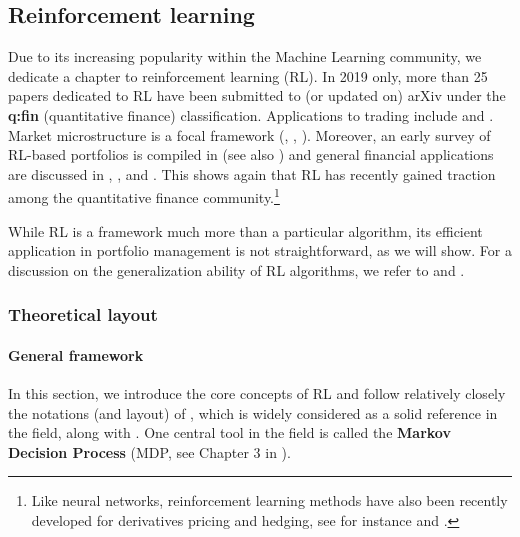 \subsection{Reinforcement learning}

Due to its increasing popularity within the Machine Learning community, we dedicate a chapter to reinforcement learning (RL). In 2019 only, more than 25 papers dedicated to RL have been submitted to (or updated on) arXiv under the \textbf{q:fin} (quantitative finance) classification. Applications to trading include \cite{xiong2018practical} and \cite{theate2020application}. Market microstructure is a focal framework (\cite{wei2019model}, \cite{ferreira2020reinforced}, \cite{karpe2020multi}).\newline
Moreover, an early survey of RL-based portfolios is compiled in \cite{sato2019model} (see also \cite{zhang2020deep}) and general financial applications are discussed in \cite{kolm2019modern}, \cite{meng2019reinforcement}, \cite{charpentier2020reinforcement} and \cite{mosavi2020comprehensive}. This shows again that RL has recently gained traction among the quantitative finance community.\footnote{Like neural networks, reinforcement learning methods have also been recently developed for derivatives pricing and hedging, see for instance \cite{kolm2019dynamic} and \cite{du2020deep}.}

While RL is a framework much more than a particular algorithm, its efficient application in portfolio management is not straightforward, as we will show. For a discussion on the generalization ability of RL algorithms, we refer to \cite{packer2018assessing} and \cite{ghosh2021generalization}.

\subsubsection{Theoretical layout}

\paragraph{General framework}

In this section, we introduce the core concepts of RL and follow relatively closely the notations (and layout) of
\cite{sutton2018reinforcement}, which is widely considered as a solid reference in the field, along with \cite{bertsekas2017dynamic}. One central tool in the field is called the \textbf{Markov Decision Process} (MDP, see Chapter 3 in \cite{sutton2018reinforcement}).

